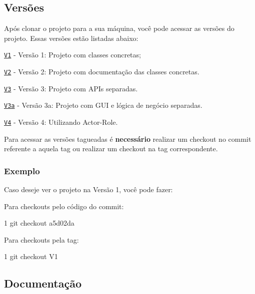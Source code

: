 \subsection*{Versões}

Após clonar o projeto para a sua máquina, você pode acessar as versões do projeto. Essas versões estão listadas abaixo\+:


\begin{DoxyItemize}
\item \href{https://bitbucket.org/KellerBreno/calculadora/commits/tag/V1}{\tt V1} -\/ Versão 1\+: Projeto com classes concretas;
\item \href{https://bitbucket.org/KellerBreno/calculadora/commits/tag/V2}{\tt V2} -\/ Versão 2\+: Projeto com documentação das classes concretas.
\item \href{https://bitbucket.org/KellerBreno/calculadora/commits/tag/V3}{\tt V3} -\/ Versão 3\+: Projeto com A\+P\+Is separadas.
\item \href{https://bitbucket.org/KellerBreno/calculadora/commits/tag/V3a}{\tt V3a} -\/ Versão 3a\+: Projeto com G\+UI e lógica de negócio separadas.
\item \href{https://bitbucket.org/KellerBreno/calculadora/commits/tag/V4}{\tt V4} -\/ Versão 4\+: Utilizando Actor-\/\+Role.
\end{DoxyItemize}

Para acessar as versões tagueadas é {\bfseries necessário} realizar um checkout no commit referente a aquela tag ou realizar um checkout na tag correspondente.

\subsubsection*{Exemplo}

Caso deseje ver o projeto na Versão 1, você pode fazer\+:

Para checkouts pelo código do commit\+:


\begin{DoxyCode}
1 git checkout a5d02da 
\end{DoxyCode}


Para checkouts pela tag\+: 
\begin{DoxyCode}
1 git checkout V1 
\end{DoxyCode}


\subsection*{Documentação}

